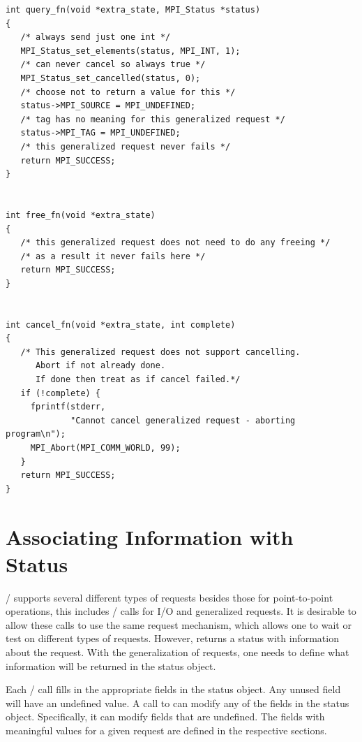\begin{example}
\begin{lstlisting}[language={[MPI]C}]
int query_fn(void *extra_state, MPI_Status *status)
{
   /* always send just one int */
   MPI_Status_set_elements(status, MPI_INT, 1);
   /* can never cancel so always true */
   MPI_Status_set_cancelled(status, 0);
   /* choose not to return a value for this */
   status->MPI_SOURCE = MPI_UNDEFINED;
   /* tag has no meaning for this generalized request */
   status->MPI_TAG = MPI_UNDEFINED;
   /* this generalized request never fails */
   return MPI_SUCCESS;
}


int free_fn(void *extra_state)
{
   /* this generalized request does not need to do any freeing */
   /* as a result it never fails here */
   return MPI_SUCCESS;
}


int cancel_fn(void *extra_state, int complete)
{
   /* This generalized request does not support cancelling.
      Abort if not already done.
      If done then treat as if cancel failed.*/
   if (!complete) {
     fprintf(stderr,
             "Cannot cancel generalized request - aborting program\n");
     MPI_Abort(MPI_COMM_WORLD, 99);
   }
   return MPI_SUCCESS;
}
\end{lstlisting}
\end{example}

\section{Associating Information with Status}
\label{sec:ei-status}

\MPI/ supports several different types of requests besides those for
point-to-point operations,
this includes
\mpi/ calls for I/O and generalized requests.  It is desirable to allow
these calls to use the same request mechanism, which allows one to
wait or test on different types of requests.  However,
%
%
%
%
%
%
%
%
 returns a status
with information about the request.  With the generalization of
requests, one needs to define what information will be returned in the
status object.

Each \MPI/
call fills in the appropriate fields in the status object.  
Any unused field will
have an undefined value.  A call to
%
%
%
%
%
%
%
%
 can modify any of
the fields in the status object.  Specifically, it can modify fields
that are undefined.  The fields with meaningful values for a given
request are defined in the respective sections.

